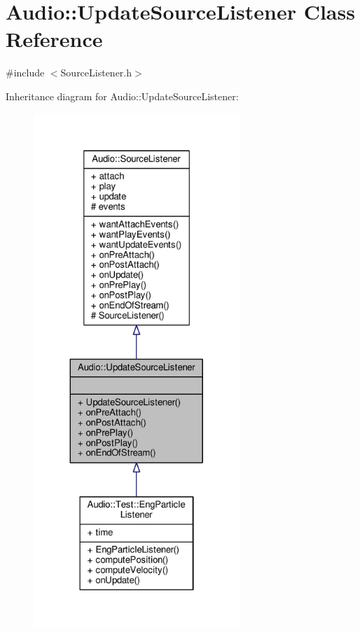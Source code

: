 \hypertarget{classAudio_1_1UpdateSourceListener}{}\section{Audio\+:\+:Update\+Source\+Listener Class Reference}
\label{classAudio_1_1UpdateSourceListener}


{\ttfamily \#include $<$Source\+Listener.\+h$>$}



Inheritance diagram for Audio\+:\+:Update\+Source\+Listener\+:
\nopagebreak
\begin{figure}[H]
\begin{center}
\leavevmode
\includegraphics[height=550pt]{d1/d3f/classAudio_1_1UpdateSourceListener__inherit__graph}
\end{center}
\end{figure}


